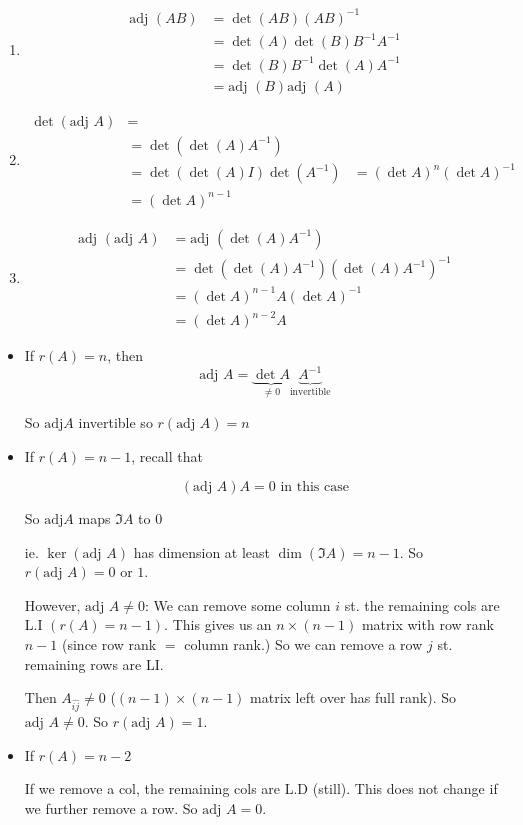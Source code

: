 \documentclass[a4paper]{article}
\begin{document}
\begin{enumerate}
	\item \begin{align*}
	\text{adj }(AB)  & =  \det(AB) (AB)^{-1}  \\
	& = \det(A)\det(B)B^{-1}A^{-1} \\
	& = \det(B) B^{-1} \det(A) A^{-1} \\
	& = \text{adj }(B) \text{adj }(A)
	\end{align*}
	
	\item \begin{align*}
	\det (\text{adj } A)& = \\
	& = \det ( \det (A) A^{-1} ) \\
	& = \det ( \det(A) I ) \det (A^{-1})
	& = (\det A)^{n} (\det A)^{-1} \\
	& = (\det A)^{n-1}
	\end{align*}	
	
	\item \begin{align*}
	\text{adj } (\text{adj } A)& = \text{adj } (  \det(A) A^{-1} ) \\
	& = \det ( \det (A) A^{-1} ) ( \det (A) A^{-1} )^{-1} \\
	& = (\det A)^{n-1} A (\det A)^{-1} \\
	& = (\det A)^{n-2} A 
	\end{align*}
\end{enumerate}


\begin{itemize}
	\item If $ r(A) = n $, then
	\[ \text{adj } A = \underbrace{\det A}_{\neq 0} \underbrace{A^{-1}}_{\text{invertible}} \]
	
	So $ \text{adj} A $ invertible so $ r(\text{adj } A) = n $
	
	\item If $ r(A) = n-1  $, recall that
	
	\[ (\text{adj } A) A = 0 \text{ in this case}  \]
	
	So $ \text{adj} A $ maps $ \Im A $ to $ 0 $
	
	ie. $ \ker(\text{adj } A) $ has dimension at least $ \dim(\Im A) = n-1 $. So $ r(\text{adj } A)  = 0 $ or $ 1 $.
	
	However, $ \text{adj }A \neq 0 $: We can remove some column $ i $ st. the remaining cols are L.I $ (r(A) = n -1) $. This gives us an $ n \times (n-1) $ matrix with row rank $ n - 1 $ (since row rank $ = $ column rank.) So we can remove a row $ j $ st. remaining rows are LI.
	
	
	
	Then $ A_{\hat{ij}} \neq 0 $ ($ (n-1) \times (n-1) $ matrix left over has full rank). So $ \text{adj } A \neq 0 $. So $ r(\text{adj } A) = 1 $.
	
	\item If $ r(A) = n - 2 $
	
	If we remove a col, the remaining cols are L.D (still). This does not change if we further remove a row. So $ \text{adj } A = 0 $.
	
\end{itemize}
\end{document}
